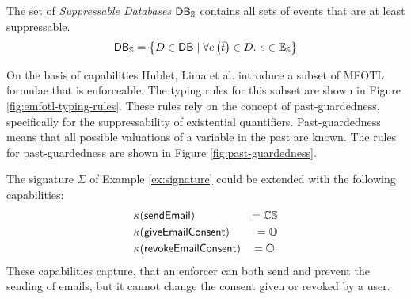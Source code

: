 \begin{definition}
    \label{def:sup-databases}
    The set of \emph{Suppressable Databases} $\mathsf{DB}_{\mathbb{S}}$ contains all sets
    of events that are at least suppressable.
    $$
        \mathsf{DB}_{\mathbb{S}} =
        \left\{
        D \in \mathsf{DB} \mid
        \forall e\left( \bar{t} \right) \in D. \ e \in \mathbb{E}_{\mathbb{S}}
        \right\}
    $$
\end{definition}

On the basis of capabilities
Hublet, Lima et al. \cite{whyenf, whyenf-2} introduce a subset of
MFOTL formulae that is enforceable.
The typing rules for this subset are shown in Figure \ref{fig:emfotl-typing-rules}.
These rules rely on the concept of past-guardedness, specifically for the
suppressability of existential quantifiers.
Past-guardedness means that all possible valuations of a variable in
the past are known.
The rules for past-guardedness are shown in Figure \ref{fig:past-guardedness}.

The signature $\Sigma$ of Example \ref{ex:signature} could be extended
with the following capabilities:
\begin{align*}
    &\kappa(\mathsf{sendEmail}) &= \mathbb{C} \mathbb{S} \\
    &\kappa(\mathsf{giveEmailConsent}) &= \mathbb{O} \\
    &\kappa(\mathsf{revokeEmailConsent}) &= \mathbb{O}.
\end{align*}
These capabilities capture, that an enforcer can both send and
prevent the sending of emails, but it cannot change the
consent given or revoked by a user.

